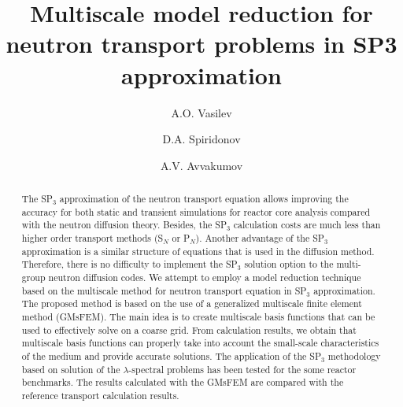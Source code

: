 \documentclass{aip-cp}
\begin{document}
\title{Multiscale model reduction for neutron transport problems in SP3 approximation}


\author[aff1]{A.O. Vasilev}
\author[aff1]{D.A. Spiridonov}
\author[aff2]{A.V. Avvakumov}


\maketitle


\begin{abstract}
The SP$_3$ approximation of the neutron transport equation allows improving the accuracy for both static and transient simulations for reactor core analysis compared with the neutron diffusion theory. 
Besides, the SP$_3$ calculation costs are much less than higher order transport methods (S$_N$ or P$_N$).
Another advantage of the SP$_3$ approximation is a similar structure of equations that is used in the diffusion method. 
Therefore, there is no difficulty to implement the SP$_3$ solution option to the multi-group neutron diffusion codes. 
We attempt to employ a model reduction technique based on the multiscale method for neutron transport equation in SP$_3$ approximation. 
The proposed method is based on the use of a generalized multiscale finite element method (GMsFEM).
The main idea is to create multiscale basis functions that can be used to effectively solve on a coarse grid.
From calculation results, we obtain that multiscale basis functions can properly take into account the small-scale characteristics of the medium and provide accurate solutions. 
The application of the SP$_3$ methodology based on solution of the $\lambda$-spectral problems has been tested for the some reactor benchmarks.
The results calculated with the GMsFEM are compared with the reference transport calculation results.
\end{abstract}
\end{document}

